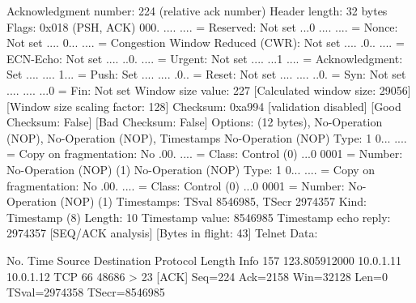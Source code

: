     Acknowledgment number: 224    (relative ack number)
    Header length: 32 bytes
    Flags: 0x018 (PSH, ACK)
        000. .... .... = Reserved: Not set
        ...0 .... .... = Nonce: Not set
        .... 0... .... = Congestion Window Reduced (CWR): Not set
        .... .0.. .... = ECN-Echo: Not set
        .... ..0. .... = Urgent: Not set
        .... ...1 .... = Acknowledgment: Set
        .... .... 1... = Push: Set
        .... .... .0.. = Reset: Not set
        .... .... ..0. = Syn: Not set
        .... .... ...0 = Fin: Not set
    Window size value: 227
    [Calculated window size: 29056]
    [Window size scaling factor: 128]
    Checksum: 0xa994 [validation disabled]
        [Good Checksum: False]
        [Bad Checksum: False]
    Options: (12 bytes), No-Operation (NOP), No-Operation (NOP), Timestamps
        No-Operation (NOP)
            Type: 1
                0... .... = Copy on fragmentation: No
                .00. .... = Class: Control (0)
                ...0 0001 = Number: No-Operation (NOP) (1)
        No-Operation (NOP)
            Type: 1
                0... .... = Copy on fragmentation: No
                .00. .... = Class: Control (0)
                ...0 0001 = Number: No-Operation (NOP) (1)
        Timestamps: TSval 8546985, TSecr 2974357
            Kind: Timestamp (8)
            Length: 10
            Timestamp value: 8546985
            Timestamp echo reply: 2974357
    [SEQ/ACK analysis]
        [Bytes in flight: 43]
Telnet
    Data: 

No.     Time           Source                Destination           Protocol Length Info
    157 123.805912000  10.0.1.11             10.0.1.12             TCP      66     48686 > 23 [ACK] Seq=224 Ack=2158 Win=32128 Len=0 TSval=2974358 TSecr=8546985

